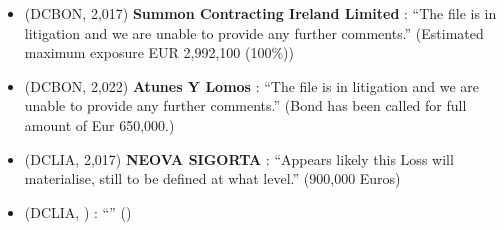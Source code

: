 \begin{itemize}
  \item (DCBON, 2,017) \textbf{ Summon Contracting Ireland Limited }: ``The file is in litigation and we are unable to provide any further comments.'' (Estimated maximum exposure EUR 2,992,100 (100\%))

  \item (DCBON, 2,022) \textbf{ Atunes Y Lomos }: ``The file is in litigation and we are unable to provide any further comments.'' (Bond has been called for full amount of Eur 650,000.)

  \item (DCLIA, 2,017) \textbf{ NEOVA SIGORTA }: ``Appears likely this Loss will materialise, still to be defined at what level.'' (900,000 Euros)

  \item (DCLIA, ) \textbf{  }: ``'' ()

\end{itemize}